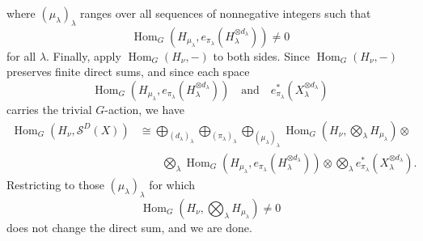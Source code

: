 \documentclass[11pt]{article}
\newcommand{\scS}{\mathcal{S}}
\newcommand{\HomG}[2]{\operatorname{Hom}_G\!\left(#1,#2\right)}
\theoremstyle{definition}
\begin{document}
where $(\mu_\lambda)_\lambda$ ranges over all sequences of nonnegative integers such that
\[
  \HomG{H_{\mu_\lambda}}{e_{\pi_\lambda}(H_\lambda^{\otimes d_\lambda})}\neq 0
\]
for all $\lambda$. Finally, apply $\HomG{H_\nu}{-}$ to both sides. Since $\HomG{H_\nu}{-}$ preserves finite direct sums, and since each space
\[
  \HomG{H_{\mu_\lambda}}{e_{\pi_\lambda}(H_\lambda^{\otimes d_\lambda})}
  \quad\text{and}\quad
  e_{\pi_\lambda}^*(X_\lambda^{\otimes d_\lambda})
\]
carries the trivial $G$-action, we have
\begin{align*}
  \HomG{H_\nu}{\scS^D(X)}
  &\cong
  \bigoplus_{(d_\lambda)_\lambda}
  \bigoplus_{(\pi_\lambda)_\lambda}
  \bigoplus_{(\mu_\lambda)_\lambda}
  \HomG{H_\nu}{\bigotimes_\lambda H_{\mu_\lambda}}\otimes\\
  &\qquad
  \bigotimes_\lambda
  \HomG{H_{\mu_\lambda}}{e_{\pi_\lambda}(H_\lambda^{\otimes d_\lambda})}
  \otimes
  \bigotimes_\lambda e_{\pi_\lambda}^*(X_\lambda^{\otimes d_\lambda}).
\end{align*}
Restricting to those $(\mu_\lambda)_\lambda$ for which
\[
  \HomG{H_\nu}{\bigotimes_\lambda H_{\mu_\lambda}}\neq 0
\]
does not change the direct sum, and we are done.
\end{document}
